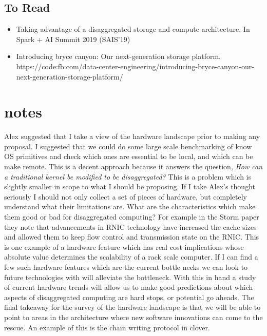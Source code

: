 \subsection{To Read}
\begin{itemize}
    \item{Taking advantage of a disaggregated storage and compute architecture. In Spark + AI Summit 2019 (SAIS'19)}
    \item{Introducing bryce canyon: Our next-generation storage platform. https://code:fb:com/data-center-engineering/introducing-bryce-canyon-our-next-generation-storage-platform/ }

\end{itemize}


\section{notes}
\label{sec:thoughts}

Alex suggested that I take a view of the hardware landscape prior to making
any proposal. I suggested that we could do some large scale benchmarking of
know OS primitives and check which ones are essential to be local, and which
can be make remote. This is a decent approach because it answers the
question, \textit{How can a traditional kernel be modified to be
disaggregated?} This is a problem which is slightly smaller in scope to what
I should be proposing. If I take Alex's thought seriously I should not only
collect a set of pieces of hardware, but completely understand what their
limitations are. What are the characteristics which make them good or bad for
disaggregated computing? For example in the Storm paper~\cite{storm} they
note that advancements in RNIC technology have increased the cache sizes and
allowed them to keep flow control and transmission state on the RNIC. This is
one example of a hardware feature which has real cost implications whose
absolute value determines the scalability of a rack scale computer. If I can
find a few such hardware features which are the current bottle necks we can
look to future technologies with will alleviate the bottleneck. With this in
hand a study of current hardware trends will allow us to make good
predictions about which aspects of disaggregated computing are hard stops, or
potential go aheads. The final takeaway for the survey of the hardware
landscape is that we will be able to point to areas in the architecture where
new software innovations can come to the rescue. An example of this is the
chain writing protocol in clover.

